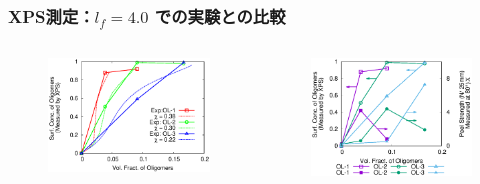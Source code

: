 \documentclass[12pt, dvipdfmx]{beamer}
\begin{document}
\begin{frame}\frametitle{XPS測定：$l_f = 4.0$ での実験との比較}

\begin{columns}
	\begin{column}{6.0cm}
		\vspace{-1\baselineskip}
		\begin{figure}[htbp]
			\begin{center}
				\includegraphics[width=60mm]{XPS_Lf_4_sin_45.eps}
			\end{center}
		\end{figure}
	\end{column}
	\begin{column}{6.0cm}
		\vspace{-0.5\baselineskip}
		\begin{figure}[htbp]
			\begin{center}
				\includegraphics[width=60mm]{Exp_Data_color.eps}

\end{center}
\end{figure}
\end{column}
\end{columns}
\end{frame}
\end{document}
